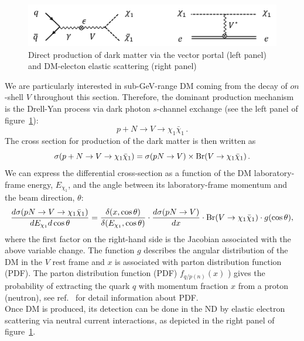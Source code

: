 \begin{figure}[t]
\centering
\includegraphics[width=\textwidth]{../graphics/DM_prod_detect}
\caption{\label{fig:dm_prod} Direct production of dark matter via the vector portal (left panel) and DM-electon elastic scattering (right panel)}
\end{figure}
We are particularly interested in sub-GeV-range DM coming from the decay of $on$-shell $V$ throughout this section. Therefore, the dominant production mechanism is the Drell-Yan process via dark photon $s$-channel exchange (see the left panel of figure~\ref{fig:dm_prod}):
\begin{equation}
p + N \rightarrow V \rightarrow \chi_1 \bar \chi_1 \,.
\end{equation}
The cross section for production of the dark matter is then written as
\begin{equation}
\sigma(p + N \rightarrow V \rightarrow \chi_1 \bar \chi_1) = \sigma(pN\rightarrow V)\times {\rm Br}(V\rightarrow \chi_1 \bar \chi_1)\,.
\end{equation}
We can express the differential cross-section as a function of the DM laboratory-frame energy, $E_{\chi_1}$, and the angle
between its laboratory-frame momentum and the beam direction, $\theta$:
\begin{equation}
\frac{d\sigma(pN\rightarrow V\rightarrow \chi_1 \bar \chi_1)}{dE_{\chi_1}d\cos\theta} 
= \frac{\delta(x, \cos\theta)}{\delta(E_{\chi_1}, \cos\theta)}\cdot \frac{d\sigma(pN\rightarrow V)}{dx}\cdot {\rm Br}(V\rightarrow \chi_1 \bar{\chi}_1)\cdot g(\cos\theta),
\end{equation}
where the first factor on the right-hand side is the Jacobian associated with the above variable change. The
function $g$ describes the angular distribution of the DM in the $V$ rest frame and $x$ is associated with parton distribution function (PDF).  The parton distribution function (PDF) $f_{q/p(n)} (x)$ ) gives the probability of extracting the quark $q$ with momentum fraction $x$ from a
proton (neutron), see ref.~\cite{deNiverville:2012ij} for detail information about PDF.\\
Once DM is produced, its detection can be done in the ND by elastic electron scattering via neutral current interactions, as depicted in the right panel of figure~\ref{fig:dm_prod}.
